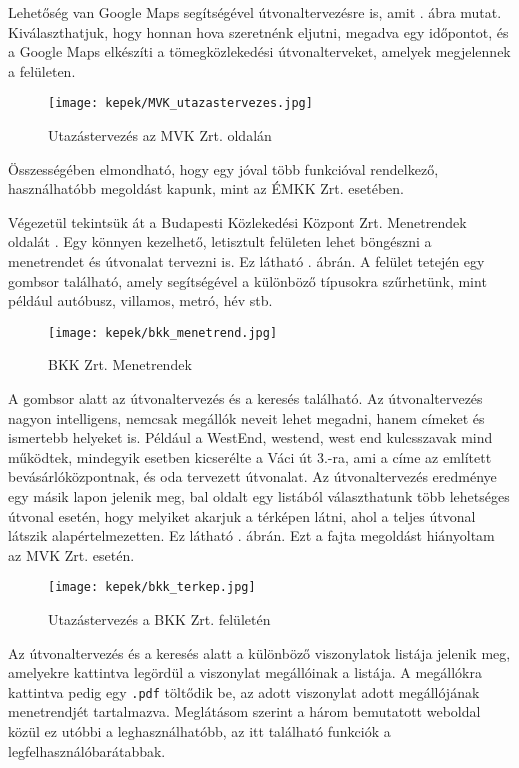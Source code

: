Lehetőség van Google Maps segítségével útvonaltervezésre is, amit . ábra mutat. Kiválaszthatjuk, hogy honnan hova szeretnénk eljutni, megadva egy időpontot, és a Google Maps elkészíti a tömegközlekedési útvonalterveket, amelyek megjelennek a felületen.

\begin{figure}[h!]
\centering
\texttt{[image: kepek/MVK\_utazastervezes.jpg]}
\caption{Utazástervezés az MVK Zrt. oldalán}
\label{fig:MVK_utazastervezes}
\end{figure}

Összességében elmondható, hogy egy jóval több funkcióval rendelkező, használhatóbb megoldást kapunk, mint az ÉMKK Zrt. esetében.

Végezetül tekintsük át a Budapesti Közlekedési Központ Zrt. Menetrendek oldalát \cite{bkk}. Egy könnyen kezelhető, letisztult felületen lehet böngészni a menetrendet és útvonalat tervezni is. Ez látható . ábrán. A felület tetején egy gombsor található, amely segítségével a különböző típusokra szűrhetünk, mint például autóbusz, villamos, metró, hév stb.

\begin{figure}[h!]
\centering
\texttt{[image: kepek/bkk\_menetrend.jpg]}
\caption{BKK Zrt. Menetrendek}
\label{fig:bkk_menetrend}
\end{figure}

A gombsor alatt az útvonaltervezés és a keresés található. Az útvonaltervezés nagyon intelligens, nemcsak megállók neveit lehet megadni, hanem címeket és ismertebb helyeket is. Például a WestEnd, westend, west end kulcsszavak mind működtek, mindegyik esetben kicserélte a Váci út 3.-ra, ami a címe az említett bevásárlóközpontnak, és oda tervezett útvonalat. Az útvonaltervezés eredménye egy másik lapon jelenik meg, bal oldalt egy listából választhatunk több lehetséges útvonal esetén, hogy melyiket akarjuk a térképen látni, ahol a teljes útvonal látszik alapértelmezetten. Ez látható . ábrán. Ezt a fajta megoldást hiányoltam az MVK Zrt. esetén.

\begin{figure}[h!]
\centering
\texttt{[image: kepek/bkk\_terkep.jpg]}
\caption{Utazástervezés a BKK Zrt. felületén}
\label{fig:bkk_terkep}
\end{figure}

Az útvonaltervezés és a keresés alatt a különböző viszonylatok listája jelenik meg, amelyekre kattintva legördül a viszonylat megállóinak a listája. A megállókra kattintva pedig egy \texttt{.pdf} töltődik be, az adott viszonylat adott megállójának menetrendjét tartalmazva.
Meglátásom szerint a három bemutatott weboldal közül ez utóbbi a leghasználhatóbb, az itt található funkciók a legfelhasználóbarátabbak.

